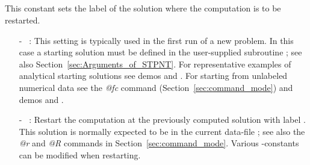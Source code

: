 \subsection{}  \label{sec:IRS}


This constant sets the label of the solution where the computation
is to be restarted.
\begin{itemize}
\item[-] ~:  
  This setting is typically used in the first run of a new problem.
  In this case a starting solution must be defined in the user-supplied
  subroutine ; see also Section~\ref{sec:Arguments_of_STPNT}.
  For representative examples of analytical starting solutions 
  see demos  and .
  For starting from unlabeled numerical data see the {\it @fc} command
  (Section~\ref{sec:command_mode}) and demos  and .
  
\item[-] ~: 
  Restart the computation at the previously computed solution with label . 
  This solution is normally expected to be in the current data-file 
 ; see also the {\it @r} and {\it @R} commands in 
 Section~\ref{sec:command_mode}.
 Various \AUTO-constants can be modified when restarting.
\end{itemize}

\subsection{}  \label{sec:IPS}

